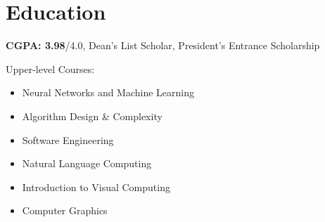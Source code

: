 \documentclass[10pt]{article}
\begin{document}
\section{Education}
\begin{itemize}
  \setlength\itemsep{0pt}
\item \textbf{CGPA: 3.98}/4.0, Dean's List Scholar, President's Entrance Scholarship
  {
    \footnotesize
  \item  Upper-level Courses:
    \setlength\multicolsep{0pt}
    \begin{multicols}{3}
      \begin{itemize} \setlength\itemsep{0pt}
      \item Neural Networks and Machine Learning
      \item Algorithm Design \& Complexity
      \item Software Engineering
      \item Natural Language Computing
      \item Introduction to Visual Computing
      \item Computer Graphics
      \end{itemize}
    \end{multicols}
  }
\end{itemize}
\end{document}

